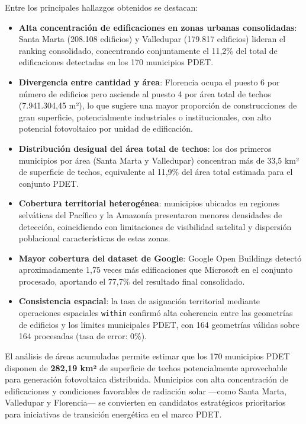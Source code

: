 \documentclass{article}
\begin{document}
Entre los principales hallazgos obtenidos se destacan:

\begin{itemize}
    \item \textbf{Alta concentración de edificaciones en zonas urbanas consolidadas}: 
    Santa Marta (208.108 edificios) y Valledupar (179.817 edificios) lideran el 
    ranking consolidado, concentrando conjuntamente el 11,2\% del total de 
    edificaciones detectadas en los 170 municipios PDET.

    \item \textbf{Divergencia entre cantidad y área}: Florencia ocupa el puesto 6 
    por número de edificios pero asciende al puesto 4 por área total de techos 
    (7.941.304,45 m²), lo que sugiere una mayor proporción de construcciones de 
    gran superficie, potencialmente industriales o institucionales, con alto 
    potencial fotovoltaico por unidad de edificación.

    \item \textbf{Distribución desigual del área total de techos}: los dos primeros 
    municipios por área (Santa Marta y Valledupar) concentran más de 33,5 km² de 
    superficie de techos, equivalente al 11,9\% del área total estimada para el 
    conjunto PDET.

    \item \textbf{Cobertura territorial heterogénea}: municipios ubicados en 
    regiones selváticas del Pacífico y la Amazonía presentaron menores densidades 
    de detección, coincidiendo con limitaciones de visibilidad satelital y 
    dispersión poblacional características de estas zonas.

    \item \textbf{Mayor cobertura del dataset de Google}: Google Open Buildings 
    detectó aproximadamente 1,75 veces más edificaciones que Microsoft en el 
    conjunto procesado, aportando el 77,7\% del resultado final consolidado.

    \item \textbf{Consistencia espacial}: la tasa de asignación territorial 
    mediante operaciones espaciales \texttt{within} confirmó alta coherencia entre 
    las geometrías de edificios y los límites municipales PDET, con 164 geometrías 
    válidas sobre 164 procesadas (tasa de error: 0\%).
\end{itemize}

El análisis de áreas acumuladas permite estimar que los 170 municipios PDET 
disponen de \textbf{282,19 km²} de superficie de techos potencialmente aprovechable 
para generación fotovoltaica distribuida. Municipios con alta concentración de 
edificaciones y condiciones favorables de radiación solar —como Santa Marta, 
Valledupar y Florencia— se convierten en candidatos estratégicos prioritarios para 
iniciativas de transición energética en el marco PDET.
\end{document}
